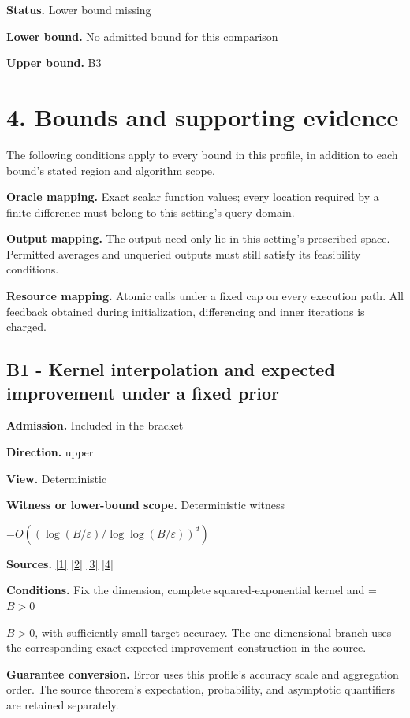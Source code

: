 \documentclass[10pt,a4paper]{article}
\newcommand{\AtlasMath}[1]{\par\begingroup\centering\setbox0=\hbox{$\displaystyle #1$}\ifdim\wd0>1.4\linewidth\typeout{ATLAS WIDE FORMULA: \the\wd0}\fi\ifdim\wd0>\linewidth\resizebox{\linewidth}{!}{\box0}\else\box0\fi\par\endgroup}
\newcommand{\AtlasInlineMath}[1]{\begingroup\setbox0=\hbox{$#1$}\ifdim\wd0>.4\linewidth\endgroup\AtlasMath{#1}\else\endgroup$#1$\fi}
\begin{document}
\textbf{Status.} Lower bound missing

\textbf{Lower bound.} No admitted bound for this comparison

\textbf{Upper bound.} B3

\section{4. Bounds and supporting evidence}
The following conditions apply to every bound in this profile, in addition to each bound's stated region and algorithm scope.

\textbf{Oracle mapping.} Exact scalar function values; every location required by a finite difference must belong to this setting's query domain.

\textbf{Output mapping.} The output need only lie in this setting's prescribed space. Permitted averages and unqueried outputs must still satisfy its feasibility conditions.

\textbf{Resource mapping.} Atomic calls under a fixed cap on every execution path. All feedback obtained during initialization, differencing and inner iterations is charged.

\subsection{B1 - Kernel interpolation and expected improvement under a fixed prior}
\textbf{Admission.} Included in the bracket

\textbf{Direction.} upper

\textbf{View.} Deterministic

\textbf{Witness or lower-bound scope.} Deterministic witness

\AtlasMath{O\!\left((\log(B/\varepsilon)/\log\log(B/\varepsilon))^d\right)}
\textbf{Sources.} \href{https://arxiv.org/html/2607.29245v2}{[1]} \href{https://proceedings.neurips.cc/paper/2021/file/b1300291698eadedb559786c809cc592-Paper.pdf}{[2]} \href{https://arxiv.org/html/2602.17940v1}{[3]} \href{https://arxiv.org/html/2502.06363v1}{[4]}

\textbf{Conditions.} Fix the dimension, complete squared-exponential kernel and \AtlasInlineMath{B>0}, with sufficiently small target accuracy. The one-dimensional branch uses the corresponding exact expected-improvement construction in the source.

\textbf{Guarantee conversion.} Error uses this profile's accuracy scale and aggregation order. The source theorem's expectation, probability, and asymptotic quantifiers are retained separately.
\end{document}
